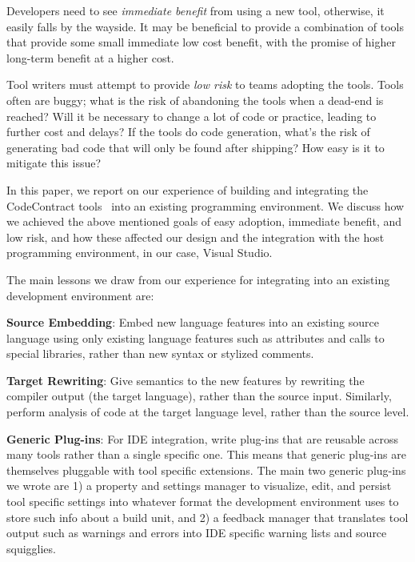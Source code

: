 \documentclass[10pt, conference, compsocconf]{IEEEtran}
\begin{document}
Developers need to see \emph{immediate benefit} from using a new tool,
otherwise, it easily falls by the wayside. It may be beneficial
to provide a combination of tools that provide some small immediate
low cost benefit, with the promise of higher long-term benefit at a
higher cost.

Tool writers must attempt to provide \emph{low risk} to teams adopting
the tools. Tools often are buggy; what is the risk of abandoning the tools
when a dead-end is reached? Will it be necessary to change a lot of code or
practice, leading to further cost and delays? If the tools do code
generation, what's the risk of generating bad code that will only
be found after shipping? How easy is it to mitigate this issue?


In this paper, we report on our experience of building and integrating
the CodeContract tools~\cite{codecontracts} into an existing programming
environment. We discuss how we achieved the above mentioned goals of
easy adoption, immediate benefit, and low risk, and how these affected
our design and the integration with the host programming environment,
in our case, Visual Studio.

The main lessons we draw from our experience for integrating into an
existing development environment are:

\textbf{Source Embedding}: Embed new language features into an existing source
  language using only existing language features such as attributes
  and calls to special libraries, rather than new syntax or stylized
  comments.

\textbf{Target Rewriting}: Give semantics to the new features by
  rewriting the compiler output (the target language), rather than the
  source input. Similarly, perform analysis of code at the target
  language level, rather than the source level.

\textbf{Generic Plug-ins}: For IDE integration, write 
  plug-ins that are reusable across many tools rather than a single
  specific one. This means that generic plug-ins are themselves
  pluggable with tool specific extensions. The main two generic
  plug-ins we wrote are 1) a property and settings manager to
  visualize, edit, and persist tool specific settings into whatever
  format the development environment uses to store such info about a
  build unit, and 2) a feedback manager that translates tool output
  such as warnings and errors into IDE specific warning lists and
  source squigglies.
\end{document}
